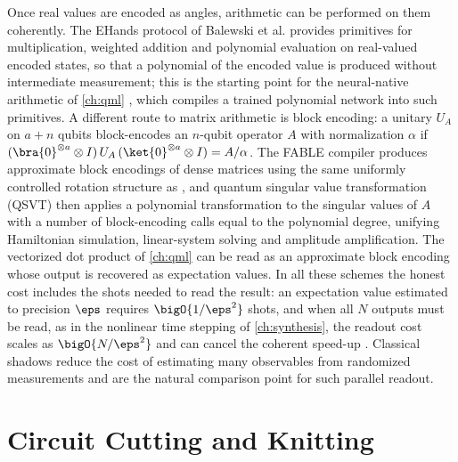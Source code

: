 Once real values are encoded as angles, arithmetic can be performed on them coherently. The EHands protocol of Balewski et al. \cite{balewski2025ehands} provides primitives for multiplication, weighted addition and polynomial evaluation on real-valued encoded states, so that a polynomial of the encoded value is produced without intermediate measurement; this is the starting point for the neural-native arithmetic of \cref{ch:qml} \cite{guo2026nnqa}, which compiles a trained polynomial network into such primitives. A different route to matrix arithmetic is block encoding: a unitary $U_A$ on $a+n$ qubits block-encodes an $n$-qubit operator $A$ with normalization $\alpha$ if $(\bra{0}^{\otimes a}\otimes I)\,U_A\,(\ket{0}^{\otimes a}\otimes I)=A/\alpha$. The FABLE compiler \cite{camps2022fable} produces approximate block encodings of dense matrices using the same uniformly controlled rotation structure as \qcrank{}, and quantum singular value transformation (QSVT) \cite{gilyen2019qsvt} then applies a polynomial transformation to the singular values of $A$ with a number of block-encoding calls equal to the polynomial degree, unifying Hamiltonian simulation, linear-system solving and amplitude amplification. The vectorized dot product of \cref{ch:qml} \cite{guo2025vqt} can be read as an approximate block encoding whose output is recovered as expectation values. In all these schemes the honest cost includes the shots needed to read the result: an expectation value estimated to precision $\eps$ requires $\bigO{1/\eps^2}$ shots, and when all $N$ outputs must be read, as in the nonlinear time stepping of \cref{ch:synthesis}, the readout cost scales as $\bigO{N/\eps^2}$ and can cancel the coherent speed-up \cite{guo2026nonlinearwaves}. Classical shadows \cite{huang2020shadows} reduce the cost of estimating many observables from randomized measurements and are the natural comparison point for such parallel readout.

\section{Circuit Cutting and Knitting}\label{sec:bg:cutting}

